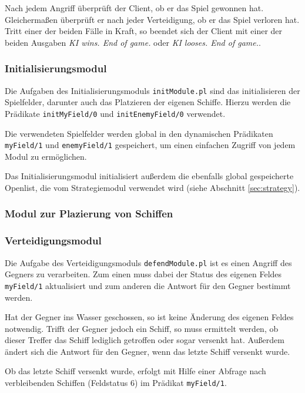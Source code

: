 	Nach jedem Angriff überprüft der Client, ob er das Spiel gewonnen hat. Gleichermaßen überprüft er nach jeder Verteidigung, 
	ob er das Spiel verloren hat. Tritt einer der beiden Fälle in Kraft, so beendet sich der Client mit einer der beiden Ausgaben
	\textit{KI wins. End of game.} oder \textit{KI looses. End of game.}.
	

\subsubsection{Initialisierungsmodul} \label{sec:initModule}
	Die Aufgaben des Initialisierungsmoduls \texttt{initModule.pl} sind das initialisieren der Spielfelder, darunter auch
	das Platzieren der eigenen Schiffe. Hierzu werden die Prädikate \texttt{initMyField/0} und \texttt{initEnemyField/0} verwendet.
	
	Die verwendeten Spielfelder werden global in den dynamischen Prädikaten \texttt{myField/1} und \texttt{enemyField/1}
	gespeichert, um einen einfachen Zugriff von jedem Modul zu ermöglichen. 
	
	Das Initialisierungsmodul initialisiert außerdem die ebenfalls global gespeicherte Openlist, 
	die vom Strategiemodul verwendet wird (siehe Abschnitt \ref{sec:strategy}). 


\subsubsection{Modul zur Plazierung von Schiffen} \label{sec:initships}	
	
\subsubsection{Verteidigungsmodul} \label{sec:defendModule}
	Die Aufgabe des Verteidigungsmoduls \texttt{defendModule.pl} ist es einen Angriff des Gegners zu verarbeiten.
	Zum einen muss dabei der Status des eigenen Feldes \texttt{myField/1} aktualisiert 
	und zum anderen die Antwort für den Gegner bestimmt werden.
	
	Hat der Gegner ins Wasser geschossen, so ist keine Änderung des eigenen Feldes notwendig. Trifft der Gegner jedoch ein Schiff,
	so muss ermittelt werden, ob dieser Treffer das Schiff lediglich getroffen oder sogar versenkt hat. Außerdem ändert sich die Antwort
	für den Gegner, wenn das letzte Schiff versenkt wurde.
	
	Ob das letzte Schiff versenkt wurde, erfolgt mit Hilfe einer Abfrage nach verbleibenden Schiffen (Feldstatus 6) im Prädikat \texttt{myField/1}.
	

